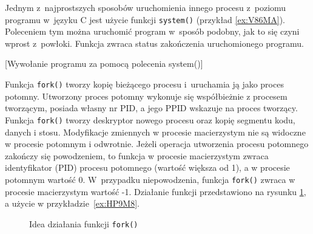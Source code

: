 Jednym z~najprostszych sposobów uruchomienia innego procesu z~poziomu programu
w~języku C jest użycie funkcji \texttt{system()} (przykład \ref{ex:V86MA}).
Poleceniem tym można uruchomić program w~sposób podobny, jak to się czyni
wprost z~powłoki. Funkcja zwraca status zakończenia uruchomionego programu.

\begin{example}{[Wywołanie programu za pomocą polecenia system()]}
  \label{ex:V86MA}
  
\end{example}

Funkcja \texttt{fork()} tworzy kopię bieżącego procesu i~uruchamia ją jako
proces potomny. Utworzony proces potomny wykonuje się współbieżnie z procesem
tworzącym, posiada własny nr PID, a jego PPID wskazuje na proces tworzący.
Funkcja \texttt{fork()} tworzy deskryptor nowego procesu oraz kopię segmentu
kodu, danych i stosu. Modyfikacje zmiennych w procesie macierzystym nie są
widoczne w procesie potomnym i odwrotnie. Jeżeli operacja utworzenia procesu
potomnego zakończy się powodzeniem, to funkcja w procesie macierzystym zwraca
identyfikator (PID) procesu potomnego (wartość większa od 1), a w procesie
potomnym wartość 0. W~przypadku niepowodzenia, funkcja \texttt{fork()} zwraca w
procesie macierzystym wartość -1. Działanie funkcji przedstawiono na rysunku
\ref{fig:S278F}, a użycie w przykładzie~\ref{ex:HP9M8}.

\begin{figure}
  \centering
  \caption{Idea działania funkcji \texttt{fork()}}
  \label{fig:S278F}
\end{figure}

